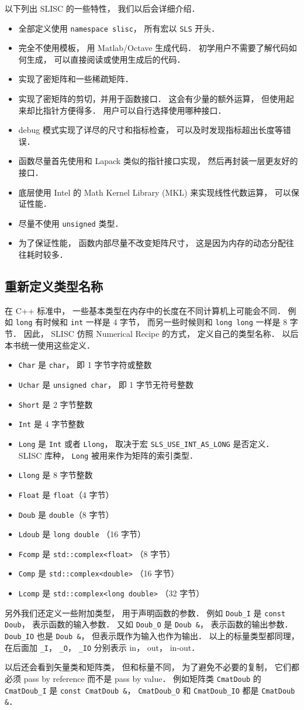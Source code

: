 以下列出 SLISC 的一些特性， 我们以后会详细介绍．
\begin{itemize}
\item 全部定义使用 \verb|namespace slisc|， 所有宏以 \verb|SLS| 开头．
\item 完全不使用模板， 用 Matlab/Octave 生成代码． 初学用户不需要了解代码如何生成， 可以直接阅读或使用生成后的代码．
\item 实现了密矩阵和一些稀疏矩阵．
\item 实现了密矩阵的剪切，并用于函数接口． 这会有少量的额外运算， 但使用起来却比指针方便得多． 用户可以自行选择使用哪种接口．
\item debug 模式实现了详尽的尺寸和指标检查， 可以及时发现指标超出长度等错误．
\item 函数尽量首先使用和 Lapack 类似的指针接口实现， 然后再封装一层更友好的接口．
\item 底层使用 Intel 的 Math Kernel Library (MKL) 来实现线性代数运算， 可以保证性能．
\item 尽量不使用 \verb|unsigned| 类型．
\item 为了保证性能， 函数内部尽量不改变矩阵尺寸， 这是因为内存的动态分配往往耗时较多．
\end{itemize}

\subsection{重新定义类型名称}
在 C++ 标准中， 一些基本类型在内存中的长度在不同计算机上可能会不同． 例如 \verb|long| 有时候和 \verb|int| 一样是 4 字节， 而另一些时候则和 \verb|long long| 一样是 8 字节． 因此， SLISC 仿照 Numerical Recipe 的方式， 定义自己的类型名称． 以后本书统一使用这些定义．
\begin{itemize}
\item \verb|Char| 是 \verb|char|， 即 1 字节字符或整数
\item \verb|Uchar| 是 \verb|unsigned char|， 即 1 字节无符号整数
\item \verb|Short| 是 2 字节整数
\item \verb|Int| 是 4 字节整数
\item \verb|Long| 是 \verb|Int| 或者 \verb|Llong|， 取决于宏 \verb|SLS_USE_INT_AS_LONG| 是否定义． SLISC 库种， \verb|Long| 被用来作为矩阵的索引类型．
\item \verb|Llong| 是 8 字节整数
\item \verb|Float| 是 \verb|float|（4 字节）
\item \verb|Doub| 是 \verb|double|（8 字节）
\item \verb|Ldoub| 是 \verb|long double| （16 字节）
\item \verb|Fcomp| 是 \verb|std::complex<float>| （8 字节）
\item \verb|Comp| 是 \verb|std::complex<double>| （16 字节）
\item \verb|Lcomp| 是 \verb|std::complex<long double>| （32 字节）
\end{itemize}
另外我们还定义一些附加类型， 用于声明函数的参数． 例如 \verb|Doub_I| 是 \verb|const Doub|， 表示函数的输入参数． 又如 \verb|Doub_O| 是 \verb|Doub &|， 表示函数的输出参数． \verb|Doub_IO| 也是 \verb|Doub &|， 但表示既作为输入也作为输出． 以上的标量类型都同理， 在后面加 \verb|_I|， \verb|_O|， \verb|_IO| 分别表示 in， out， in-out．

以后还会看到矢量类和矩阵类， 但和标量不同， 为了避免不必要的复制， 它们都必须 pass by reference 而不是 pass by value． 例如矩阵类 \verb|CmatDoub| 的 \verb|CmatDoub_I| 是 \verb|const CmatDoub &|， \verb|CmatDoub_O| 和 \verb|CmatDoub_IO| 都是 \verb|CmatDoub &|．
